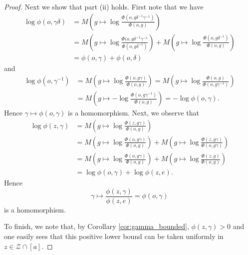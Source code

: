 \documentclass[10pt,a4paper]{amsart}
\begin{document}
\begin{proof}
Next we show that part (ii) holds.
First note that we have
\begin{align*}
\log \phi(o,\gamma \delta) &=
M\left(g \mapsto \log \frac{\Phi(o,g\delta^{-1}\gamma^{-1})}{\Phi(o,g)}\right)
\\
&= M\left(g \mapsto \log \frac{\Phi(o,g\delta^{-1}\gamma^{-1}}{\Phi(o,g\delta^{-1})}\right)
+
M\left(g \mapsto \log \frac{\Phi(o,g\delta^{-1})}{\Phi(o,g)}\right)
\\
&=
\phi(o,\gamma) + \phi(o,\delta)
\end{align*}
and
\begin{align*}
\log \phi(o,\gamma^{-1}) 
&= 
M\left(g \mapsto \log \frac{\Phi(o,g\gamma)}{\Phi(o,g)}\right)
=
M\left(g \mapsto \log \frac{\Phi(o,g)}{\Phi(o,g\gamma^{-1})}\right)
\\
&= 
M\left(g \mapsto -\log \frac{\Phi(o,g\gamma^{-1})}{\Phi(o,g)}\right)
= -\log \phi(o,\gamma).
\end{align*}
Hence $\gamma \mapsto \phi(o,\gamma)$ is a homomorphism.
Next, we observe that
\begin{align*}
\log \phi(z,\gamma) &= 
M\left(g \mapsto \log \frac{\Phi(z,g\gamma)}{\Phi(o,g)}\right)
\\
&= M\left(g \mapsto \log \frac{\Phi(o,g\gamma)}{\Phi(o,g)}\right)
+
M\left(g \mapsto \log \frac{\Phi(z,g\gamma)}{\Phi(o,g\gamma)}\right)
\\
&= M\left(g \mapsto \log \frac{\Phi(o,g\gamma)}{\Phi(o,g)}\right)
+
M\left(g \mapsto \log \frac{\Phi(z,g)}{\Phi(o,g)}\right)
\\
&= \log \phi(o,\gamma) + \log \phi(z,e).
\end{align*}
Hence
\[
\gamma \mapsto \frac{\phi(z,\gamma)}{\phi(z,e)} = \phi(o,\gamma)
\]
is a homomorphism.

To finish, we note that, by Corollary \ref{cor:gamma_bounded}, $\phi(z,\gamma)>0$ and 
one easily sees that this positive lower bound can be taken uniformly in $z \in \mathcal Z \cap [a]$.
\end{proof}
\end{document}
